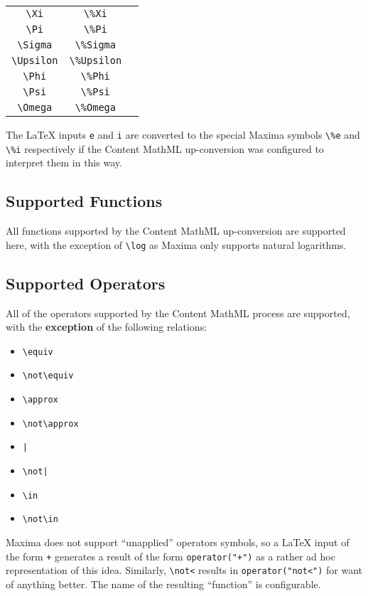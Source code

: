 \begin{tabular}{|c|c|c|}
\verb|\Xi| & \verb|\%Xi| & \ue{\verb|\Xi|} \\
\verb|\Pi| & \verb|\%Pi| & \ue{\verb|\Pi|} \\
\verb|\Sigma| & \verb|\%Sigma| & \ue{\verb|\Sigma|} \\
\verb|\Upsilon| & \verb|\%Upsilon| & \ue{\verb|\Upsilon|} \\
\verb|\Phi| & \verb|\%Phi| & \ue{\verb|\Phi|} \\
\verb|\Psi| & \verb|\%Psi| & \ue{\verb|\Psi|} \\
\verb|\Omega| & \verb|\%Omega| & \ue{\verb|\Omega|} \\
\hline
\hline
\end{tabular}

The LaTeX inputs \verb|e| and \verb|i| are converted to the special
Maxima symbols \verb|\%e| and \verb|\%i| respectively if the Content MathML
up-conversion was configured to interpret them in this way.

\subsection*{Supported Functions}

All functions supported by the Content MathML up-conversion are supported
here, with the exception of \verb|\log| as Maxima only supports natural
logarithms.

\subsection*{Supported Operators}

All of the operators supported by the Content MathML process are
supported, with the \textbf{exception} of the following relations:

\begin{itemize}
  \item \verb|\equiv|
  \item \verb|\not\equiv|
  \item \verb|\approx|
  \item \verb|\not\approx|
  \item \verb.|.
  \item \verb.\not|.
  \item \verb|\in|
  \item \verb|\not\in|
\end{itemize}

Maxima does not support ``unapplied'' operators symbols, so a LaTeX input
of the form \verb|+| generates a result of the form \verb|operator("+")|
as a rather ad hoc representation of this idea. Similarly, \verb|\not<| results
in \verb|operator("not<")| for want of anything better.
The name of the resulting ``function'' is configurable.

